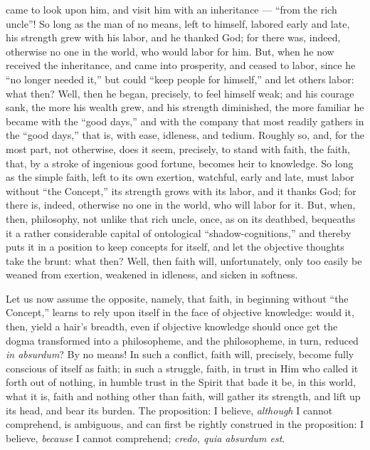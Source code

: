 \documentclass[12pt]{book}
\begin{document}
came to look upon him, and visit him with an inheritance --- ``from the rich uncle''! So long as the man of no means, left to himself, labored early and late, his strength grew with his labor, and he thanked God; for there was, indeed, otherwise no one in the world, who would labor for him. But, when he now received the inheritance, and came into prosperity, and ceased to labor, since he ``no longer needed it,'' but could ``keep people for himself,'' and let others labor: what then? Well, then he began, precisely, to feel himself weak; and his courage sank, the more his wealth grew, and his strength diminished, the more familiar he became with the ``good days,'' and with the company that most readily gathers in the ``good days,'' that is, with ease, idleness, and tedium. Roughly so, and, for the most part, not otherwise, does it seem, precisely, to stand with faith, the faith, that, by a stroke of ingenious good fortune, becomes heir to knowledge. So long as the simple faith, left to its own exertion, watchful, early and late, must labor without ``the Concept,'' its strength grows with its labor, and it thanks God; for there is, indeed, otherwise no one in the world, who will labor for it. But, when, then, philosophy, not unlike that rich uncle, once, as on its deathbed, bequeaths it a rather considerable capital of ontological ``shadow-cognitions,'' and thereby puts it in a position to keep concepts for itself, and let the objective thoughts take the brunt: what then? Well, then faith will, unfortunately, only too easily be weaned from exertion, weakened in idleness, and sicken in softness.

Let us now assume the opposite, namely, that faith, in beginning without ``the Concept,'' learns to rely upon itself in the face of objective knowledge: would it, then, yield a hair's breadth, even if objective knowledge should once get the dogma transformed into a philosopheme, and the philosopheme, in turn, reduced \textit{in absurdum}? By no means! In such a conflict, faith will, precisely, become fully conscious of itself as faith; in such a struggle, faith, in trust in Him who called it forth out of nothing, in humble trust in the Spirit that bade it be, in this world, what it is, faith and nothing other than faith, will gather its strength, and lift up its head, and bear its burden. The proposition: I believe, \emph{although} I cannot comprehend, is ambiguous, and can first be rightly construed in the proposition: I believe, \emph{because} I cannot comprehend; \textit{credo, quia absurdum est}.
\end{document}
